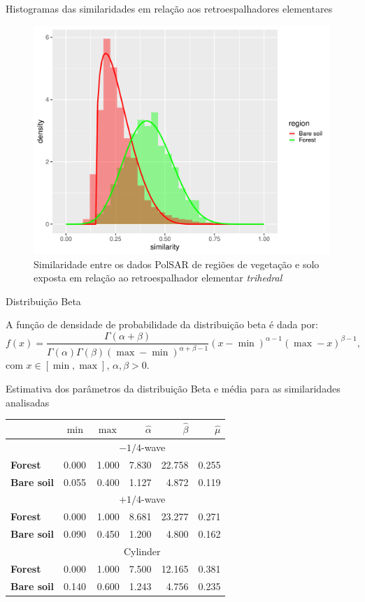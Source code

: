 \documentclass[10pt]{beamer}
\begin{document}
\begin{frame}{Histogramas das similaridades em relação aos retroespalhadores elementares}

\begin{figure}
    \centering
    \includegraphics[width = .6\linewidth]{tr.pdf}
    \caption{Similaridade entre os dados PolSAR de regiões de vegetação e solo exposta em relação ao retroespalhador elementar \textit{trihedral}}
    \label{fig:tr}
\end{figure}
    
\end{frame}

\begin{frame}{Distribuição Beta}

A função de densidade de probabilidade da distribuição beta é dada por:
$$
f(x) = \frac{\Gamma(\alpha+\beta)}{\Gamma(\alpha)\Gamma(\beta)(\max - \min)^{\alpha + \beta - 1}}(x - \min)^{\alpha-1}(\max-x)^{\beta-1},
$$
com $x \in [\min, \max]$, $\alpha,\beta>0$.
    
\end{frame}

\begin{frame}{Estimativa dos parâmetros da distribuição Beta e média para as similaridades analisadas}
\begin{table}[hbt]
\centering
\begin{tabular}{lrrrrr}
\toprule
& $\min$ & $\max$ & $\widehat\alpha$ & $\widehat\beta$ & $\widehat\mu$\\ \midrule
& \multicolumn{5}{c}{$-1/4$-wave}\\
\cmidrule(lr){2-6}
\textbf{Forest} & 0.000 & 1.000 & 7.830 & 22.758 & 0.255\\
\textbf{Bare soil} & 0.055 & 0.400 & 1.127 & 4.872 & 0.119\\
\midrule
%
& \multicolumn{5}{c}{$+1/4$-wave}\\
\cmidrule(lr){2-6}
\textbf{Forest} & 0.000 & 1.000 & 8.681 & 23.277 & 0.271\\
\textbf{Bare soil} & 0.090 & 0.450 & 1.200 & 4.800 & 0.162\\
\midrule
%
& \multicolumn{5}{c}{Cylinder}\\
\cmidrule(lr){2-6}
\textbf{Forest} & 0.000 & 1.000 & 7.500 & 12.165 & 0.381\\
\textbf{Bare soil} & 0.140 & 0.600 & 1.243 & 4.756 & 0.235\\
\bottomrule
\end{tabular}
\end{table}
\end{frame}
\end{document}
